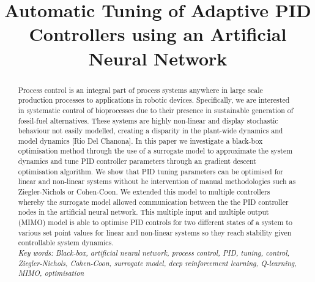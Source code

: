 \documentclass[conference]{IEEEtran}
\theoremstyle{definition}
\begin{document}
\title{Automatic Tuning of Adaptive PID Controllers using an Artificial Neural Network}


\author{
}


\pagestyle{plain}
\maketitle
\thispagestyle{plain}

\begin{abstract}
Process control is an integral part of process systems anywhere in large scale production processes to applications in robotic devices. Specifically, we are interested in systematic control of bioprocesses due to their presence in sustainable generation of fossil-fuel alternatives. These systems are highly non-linear and display stochastic behaviour not easily modelled, creating a disparity in the plant-wide dynamics and model dynamics [Rio Del Chanona]. In this paper we investigate a black-box optimisation method through the use of a surrogate model to approximate the system dynamics and tune PID controller parameters through an gradient descent optimisation algorithm. We show that PID tuning parameters can be optimised for linear and non-linear systems without he intervention of manual methodologies such as Ziegler-Nichols or Cohen-Coon. We extended this model to multiple controllers whereby the surrogate model allowed communication between the the PID controller nodes in the artificial neural network. This multiple input and multiple output (MIMO) model is able to optimise PID controls for two different states of a system to various set point values for linear and non-linear systems so they reach stability given controllable system dynamics. \\

\noindent \textit{Key words: Black-box, artificial neural network, process control, PID, tuning, control, Ziegler-Nichols, Cohen-Coon, surrogate model, deep reinforcement learning, Q-learning, MIMO, optimisation}\end{abstract}
\end{document}
